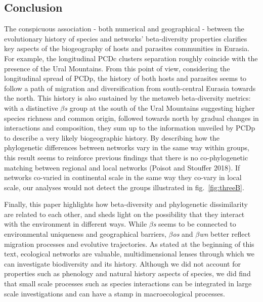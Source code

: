 \documentclass[12pt]{article}
\begin{document}
\hypertarget{conclusion}{%
\subsection{Conclusion}\label{conclusion}}

The conspicuous association - both numerical and geographical - between
the evolutionary history of species and networks' beta-diversity
properties clarifies key aspects of the biogeography of hosts and
parasites communities in Eurasia. For example, the longitudinal PCDc
clusters separation roughly coincide with the presence of the Ural
Mountains. From this point of view, considering the longitudinal spread
of PCDp, the history of both hosts and parasites seems to follow a path
of migration and diversification from south-central Eurasia towards the
north. This history is also sustained by the metaweb beta-diversity
metrics: with a distinctive \emph{\(\beta\)s} group at the south of the
Ural Mountains suggesting higher species richness and common origin,
followed towards north by gradual changes in interactions and
composition, they sum up to the information unveiled by PCDp to describe
a very likely biogeographic history. By describing how the phylogenetic
differences between networks vary in the same way within groups, this
result seems to reinforce previous findings that there is no
co-phylogenetic matching between regional and local networks (Poisot and
Stouffer 2018). If networks co-varied in continental scale in the same
way they co-vary in local scale, our analyses would not detect the
groups illustrated in fig.~\ref{fig:threeB}.

Finally, this paper highlights how beta-diversity and phylogenetic
dissimilarity are related to each other, and sheds light on the
possibility that they interact with the environment in different ways.
While \emph{\(\beta\)s} seems to be connected to environmental
uniqueness and geographical barriers, \emph{\(\beta\)os} and
\emph{\(\beta\)wn} better reflect migration processes and evolutive
trajectories. As stated at the beginning of this text, ecological
networks are valuable, multidimensional lenses through which we can
investigate biodiversity and its history. Although we did not account
for properties such as phenology and natural history aspects of species,
we did find that small scale processes such as species interactions can
be integrated in large scale investigations and can have a stamp in
macroecological processes.
\end{document}
